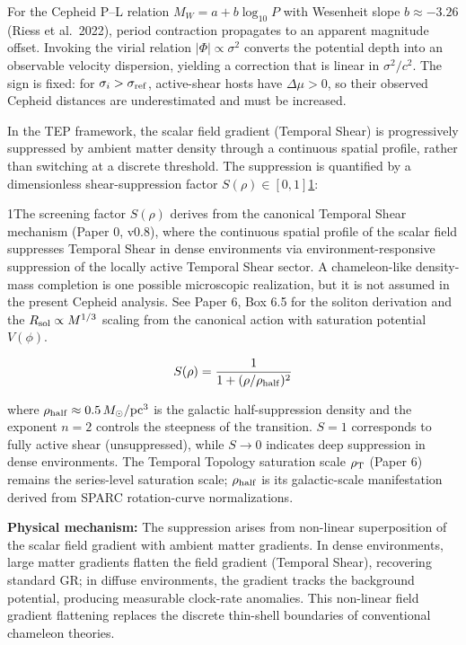 \documentclass[
]{article}
\begin{document}
For the Cepheid P--L relation \(M_W = a + b\log_{10}P\) with Wesenheit
slope \(b \approx -3.26\) (Riess et al.~2022), period contraction
propagates to an apparent magnitude offset. Invoking the virial relation
\(|\Phi| \propto \sigma^2\) converts the potential depth into an
observable velocity dispersion, yielding a correction that is linear in
\(\sigma^2/c^2\). The sign is fixed: for
\(\sigma_i > \sigma_{\rm ref}\), active-shear hosts have
\(\Delta\mu > 0\), so their observed Cepheid distances are
underestimated and must be increased.

In the TEP framework, the scalar field gradient (Temporal Shear) is
progressively suppressed by ambient matter density through a continuous
spatial profile, rather than switching at a discrete threshold. The
suppression is quantified by a dimensionless shear-suppression factor
\(S(\rho) \in [0,1]\)\hyperref[fn-screening]{1}:

1The screening factor \(S(\rho)\) derives from the canonical Temporal
Shear mechanism (Paper 0, v0.8), where the continuous spatial profile of
the scalar field suppresses Temporal Shear in dense environments via
environment-responsive suppression of the locally active Temporal Shear
sector. A chameleon-like density-mass completion is one possible
microscopic realization, but it is not assumed in the present Cepheid
analysis. See Paper 6, Box 6.5 for the soliton derivation and the
\(R_{\rm sol} \propto M^{1/3}\) scaling from the canonical action with
saturation potential \(V(\phi)\).

\begin{equation}
S(\rho) = \frac{1}{1 + (\rho / \rho_{\rm half})^2}
\label{eq:shear_suppression}
\end{equation}

where \(\rho_{\rm half} \approx 0.5 \, M_\odot/\text{pc}^3\) is the
galactic half-suppression density and the exponent \(n=2\) controls the
steepness of the transition. \(S = 1\) corresponds to fully active shear
(unsuppressed), while \(S \rightarrow 0\) indicates deep suppression in
dense environments. The Temporal Topology saturation scale
\(\rho_{\rm T}\) (Paper 6) remains the series-level saturation scale;
\(\rho_{\rm half}\) is its galactic-scale manifestation derived from
SPARC rotation-curve normalizations.

\textbf{Physical mechanism:} The suppression arises from non-linear
superposition of the scalar field gradient with ambient matter
gradients. In dense environments, large matter gradients flatten the
field gradient (Temporal Shear), recovering standard GR; in diffuse
environments, the gradient tracks the background potential, producing
measurable clock-rate anomalies. This non-linear field gradient
flattening replaces the discrete thin-shell boundaries of conventional
chameleon theories.
\end{document}
